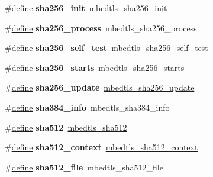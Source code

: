\begin{DoxyCompactItemize}
\#\hyperlink{structdefine}{define} {\bfseries sha256\+\_\+init}~\hyperlink{sha256_8h_a7c7c355490ffac9fb942cab02361932c}{mbedtls\+\_\+sha256\+\_\+init}
\item 
\mbox{\label{compat-1_83_8h_a65d3246fd185da4f76ecb65451e53f99}} 
\#\hyperlink{structdefine}{define} {\bfseries sha256\+\_\+process}~mbedtls\+\_\+sha256\+\_\+process
\item 
\mbox{\label{compat-1_83_8h_a9dfaa6c582042ddecafdce18e0606b4c}} 
\#\hyperlink{structdefine}{define} {\bfseries sha256\+\_\+self\+\_\+test}~\hyperlink{sha256_8h_af1d395a98568e0c71fe4740f73ba8cd7}{mbedtls\+\_\+sha256\+\_\+self\+\_\+test}
\item 
\mbox{\label{compat-1_83_8h_a43ba6128d31c027107f860f04589182e}} 
\#\hyperlink{structdefine}{define} {\bfseries sha256\+\_\+starts}~\hyperlink{sha256_8h_af6ad5542b79bf8f404b97c8b1545037e}{mbedtls\+\_\+sha256\+\_\+starts}
\item 
\mbox{\label{compat-1_83_8h_a345ad11b5b46c24916432cb7764a9ba9}} 
\#\hyperlink{structdefine}{define} {\bfseries sha256\+\_\+update}~\hyperlink{sha256_8h_a6912ef7d2b86fd056630389f469c17d2}{mbedtls\+\_\+sha256\+\_\+update}
\item 
\mbox{\label{compat-1_83_8h_a3a1cd6005dcad110185001975ed74905}} 
\#\hyperlink{structdefine}{define} {\bfseries sha384\+\_\+info}~mbedtls\+\_\+sha384\+\_\+info
\item 
\mbox{\label{compat-1_83_8h_aaa9557212a92da31b26443d6e2a7c7b3}} 
\#\hyperlink{structdefine}{define} {\bfseries sha512}~\hyperlink{sha512_8h_a692398e0644b6dd6983891205984c128}{mbedtls\+\_\+sha512}
\item 
\mbox{\label{compat-1_83_8h_ab600cf7a614bd1279982d08dc9ae553e}} 
\#\hyperlink{structdefine}{define} {\bfseries sha512\+\_\+context}~\hyperlink{structmbedtls__sha512__context}{mbedtls\+\_\+sha512\+\_\+context}
\item 
\mbox{\label{compat-1_83_8h_a63f45a83d0cb30dec073a9c9c9339a0a}} 
\#\hyperlink{structdefine}{define} {\bfseries sha512\+\_\+file}~mbedtls\+\_\+sha512\+\_\+file
\item 

\end{DoxyCompactItemize}
